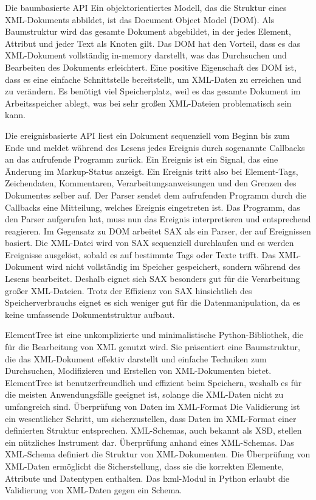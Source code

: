 Die baumbasierte API
Ein objektorientiertes Modell, das die Struktur eines XML-Dokuments abbildet, ist das Document Object Model (DOM).
Als Baumstruktur wird das gesamte Dokument abgebildet, in der jedes Element, Attribut und jeder Text als Knoten gilt.
Das DOM hat den Vorteil, dass es das \ac{XML}-Dokument vollständig in-memory darstellt, was das Durchsuchen und Bearbeiten des Dokuments erleichtert.
Eine positive Eigenschaft des DOM ist, dass es eine einfache Schnittstelle bereitstellt, um XML-Daten zu erreichen und zu verändern.
Es benötigt viel Speicherplatz, weil es das gesamte Dokument im Arbeitsspeicher ablegt, was bei sehr großen \ac{XML}-Dateien problematisch sein kann.





Die ereignisbasierte API liest ein Dokument sequenziell vom Beginn bis zum Ende
und meldet während des Lesens jedes Ereignis durch sogenannte Callbacks an das aufrufende Programm zurück.
Ein Ereignis ist ein Signal, das eine Änderung im Markup-Status anzeigt.
Ein Ereignis tritt also bei Element-Tags, Zeichendaten, Kommentaren, Verarbeitungsanweisungen und den Grenzen des Dokumentes selber auf.
Der Parser sendet dem aufrufenden Programm durch die Callbacks eine Mitteilung, welches Ereignis eingetreten ist.
Das Programm, das den Parser aufgerufen hat, muss nun das Ereignis interpretieren und entsprechend reagieren.
Im Gegensatz zu DOM arbeitet SAX als ein Parser, der auf Ereignissen basiert.
Die \ac{XML}-Datei wird von SAX sequenziell durchlaufen und es werden Ereignisse ausgelöst, sobald es auf bestimmte Tags oder Texte trifft.
Das \ac{XML}-Dokument wird nicht vollständig im Speicher gespeichert, sondern während des Lesens bearbeitet.
Deshalb eignet sich SAX besonders gut für die Verarbeitung großer \ac{XML}-Dateien.
Trotz der Effizienz von SAX hinsichtlich des Speicherverbrauchs eignet es sich weniger gut für die Datenmanipulation, da es keine umfassende Dokumentstruktur aufbaut.


ElementTree ist eine unkomplizierte und minimalistische Python-Bibliothek, die für die Bearbeitung von \ac{XML} genutzt wird.
Sie präsentiert eine Baumstruktur, die das \ac{XML}-Dokument effektiv darstellt und einfache Techniken zum Durchsuchen,
Modifizieren und Erstellen von \ac{XML}-Dokumenten bietet.
ElementTree ist benutzerfreundlich und effizient beim Speichern, weshalb es für die meisten Anwendungsfälle geeignet ist,
solange die \ac{XML}-Daten nicht zu umfangreich sind.
Überprüfung von Daten im XML-Format Die Validierung ist ein wesentlicher Schritt, um sicherzustellen,
dass Daten im XML-Format einer definierten Struktur entsprechen.
\ac{XML}-Schemas, auch bekannt als XSD, stellen ein nützliches Instrument dar.
Überprüfung anhand eines \ac{XML}-Schemas.  Das \ac{XML}-Schema definiert die Struktur von \ac{XML}-Dokumenten.
Die Überprüfung von \ac{XML}-Daten ermöglicht die Sicherstellung, dass sie die korrekten Elemente, Attribute und Datentypen enthalten.
Das lxml-Modul in Python erlaubt die Validierung von \ac{XML}-Daten gegen ein Schema.



\pagebreak